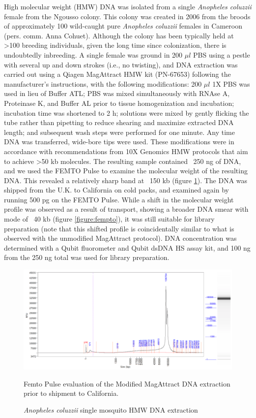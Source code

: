 \par{
High molecular weight (HMW) DNA was isolated from a single \textit{Anopheles coluzzii} female from the Ngousso colony. This colony was created in 2006 from the broods of approximately 100 wild-caught pure \textit{Anopheles coluzzii} females in Cameroon (pers. comm. Anna Cohuet). Although the colony has been typically held at >100 breeding individuals, given the long time since colonization, there is undoubtedly inbreeding. A single female was ground in 200 $\mu l$ PBS using a pestle with several up and down strokes (i.e., no twisting), and DNA extraction was carried out using a Qiagen MagAttract HMW kit (PN-67653) following the manufacturer's instructions, with the following modifications: 200 $\mu l$ 1X PBS was used in lieu of Buffer ATL; PBS was mixed simultaneously with RNAse A, Proteinase K, and Buffer AL prior to tissue homogenization and incubation; incubation time was shortened to 2 h; solutions were mixed by gently flicking the tube rather than pipetting to reduce shearing and maximize extracted DNA length; and subsequent wash steps were performed for one minute. Any time DNA was transferred, wide-bore tips were used. These modifications were in accordance with recommendations from 10X Genomics HMW protocols that aim to achieve >50 kb molecules. The resulting sample contained ~250 ng of DNA, and we used the FEMTO Pulse to examine the molecular weight of the resulting DNA. This revealed a relatively sharp band at ~150 kb (figure \ref{figure:fempto2}). The DNA was shipped from the U.K. to California on cold packs, and examined again by running 500 pg on the FEMTO Pulse. While a shift in the molecular weight profile was observed as a result of transport, showing a broader DNA smear with mode of ~40 kb (figure \ref{figure:fempto}), it was still suitable for library preparation (note that this shifted profile is coincidentally similar to what is observed with the unmodified MagAttract protocol). DNA concentration was determined with a Qubit fluorometer and Qubit dsDNA HS assay kit, and 100 ng from the 250 ng total was used for library preparation.
}


\begin{figure}[htbp!]
\caption{\textit{Anopheles coluzzii} single mosquito HMW DNA extraction}
\label{figure:fempto2}
\begin{centering}
\includegraphics[width=.85\textwidth]{fempto2.png}
\par{ Femto Pulse evaluation of the Modified MagAttract DNA extraction prior to shipment to
California. }
\end{centering}
\end{figure}

